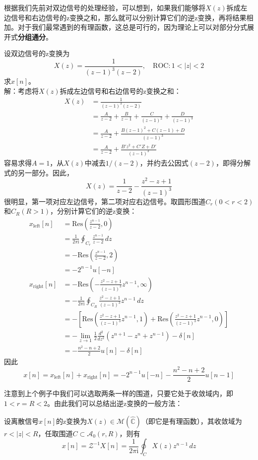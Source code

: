 根据我们先前对双边信号的处理经验，可以想到，如果我们能够将$X(z)$拆成左边信号和右边信号的z变换之和，那么就可以分别计算它们的逆z变换，再将结果相加。对于我们最常遇到的有理函数，这总是可行的，因为理论上可以对部分分式展开式\textbf{分组通分}。
\begin{example}
    设双边信号的z变换为
    \[X(z)=\frac{1}{(z-1)^3(z-2)},\quad \mathrm{ROC}:1<|z|<2\]
    求$x[n]$。\\
    解：考虑将$X(z)$拆成左边信号和右边信号的z变换之和：
    \begin{align*}
        X(z)&=\frac{1}{(z-1)^3(z-2)}\\
        &=\frac{A}{z-2}+\frac{B}{z-1}+\frac{C}{(z-1)^2}+\frac{D}{(z-1)^3}\\
        &=\frac{A}{z-2}+\frac{B(z-1)^2+C(z-1)+D}{(z-1)^3}\\
        &=\frac{A}{z-2}+\frac{B'z^2+C'Z+D'}{(z-1)^3}
    \end{align*}
    容易求得$A=1$，从$X(z)$中减去$1/(z-2)$，并约去公因式$(z-2)$，即得分解式的另一部分。因此，
    \[X(z)=\frac{1}{z-2}-\frac{z^2-z+1}{(z-1)^3}\]
    很明显，第一项对应左边信号，第二项对应右边信号。取圆形围道$C_r(0<r<2)$和$C_R(R>1)$，分别计算它们的逆z变换：
    \begin{align*}
        x_{\text{left}}[n]&=\mathrm{Res}\left(\frac{z^{n-1}}{z-2},0\right)\\
        &=\frac{1}{2\pi \mathrm{i}}\oint_{C_r}\frac{z^{n-1}}{z-2}\,dz\\
        &=-\mathrm{Res}\left(\frac{z^{n-1}}{z-2},2\right)\\
        &=-2^{n-1}u[-n]\\
        x_{\text{right}}[n]&=-\mathrm{Res}\left(-\frac{z^2-z+1}{(z-1)^3}z^{n-1},\infty\right)\\
        &=-\frac{1}{2\pi \mathrm{i}}\oint_{C_R}\frac{z^2-z+1}{(z-1)^3}z^{n-1}\,dz\\
        &=-\left[\mathrm{Res}\left(\frac{z^2-z+1}{(z-1)^3}z^{n-1},1\right)+\mathrm{Res}\left(\frac{z^2-z+1}{(z-1)^3}z^{n-1},0\right)\right]\\
        &=-\lim_{z\to 1}\frac{1}{2}\frac{d^2}{dz^2}\left(z^{n+1}-z^{n}+z^{n-1}\right)-\delta[n]\\
        &=-\frac{n^2-n+2}{2}u[n]-\delta[n]
    \end{align*}
    因此
    \[x[n]=x_{\text{left}}[n]+x_{\text{right}}[n]=-2^{n-1}u[-n]-\frac{n^2-n+2}{2}u[n-1]\]
\end{example}

注意到上个例子中我们可以选取两条一样的围道，只要它处于收敛域内，即$1<r=R<2$。由此我们可以总结出逆z变换的一般方法：
\begin{theorem}\label{thm:z_inverse}
    设离散信号$x[n]$的z变换为$X(z)\in\mathcal{M} \left(\hat{\mathbb{C}}\right)$（即它是有理函数），其收敛域为$r<|z|<R$，任取围道$C\subset\mathcal{A} _0(r,R)$，则有
    \[x[n]=\mathcal{Z} ^{-1}X[n]=\frac{1}{2\pi \mathrm{i}}\oint_{C}X(z)z^{n-1}\,dz\]
\end{theorem}

